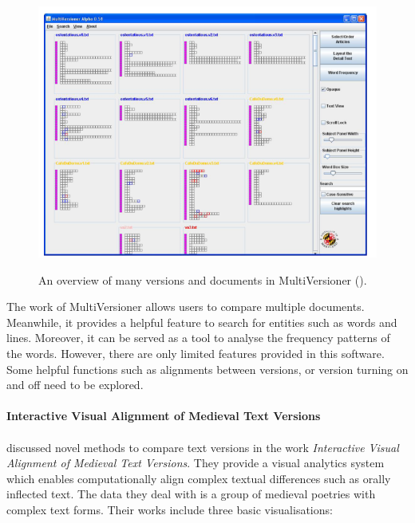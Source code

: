 \begin{figure}[H]
	\centering    
	\includegraphics[scale=0.9]{Figs/MultiVersioner}\\[1ex]
	\caption{An overview of many versions and documents in MultiVersioner (\cite{Jong2008}).}
	\label{fig:multiVersioner}
\end{figure} 

The work of MultiVersioner allows users to compare multiple documents. Meanwhile, it provides a helpful feature to search for entities such as words and lines. Moreover, it can be served as a tool to analyse the frequency patterns of the words. However, there are only limited features provided in this software. Some helpful functions such as alignments between versions, or version turning on and off need to be explored.

\paragraph{Interactive Visual Alignment of Medieval Text Versions}
\paragraph[]{}

\cite{Stefan2017} discussed novel methods to compare text versions in the work \emph{Interactive Visual Alignment of Medieval Text Versions}. They provide a visual analytics system which enables computationally align complex textual differences such as orally inflected text. The data they deal with is a group of medieval poetries with complex text forms. Their works include three basic visualisations:

